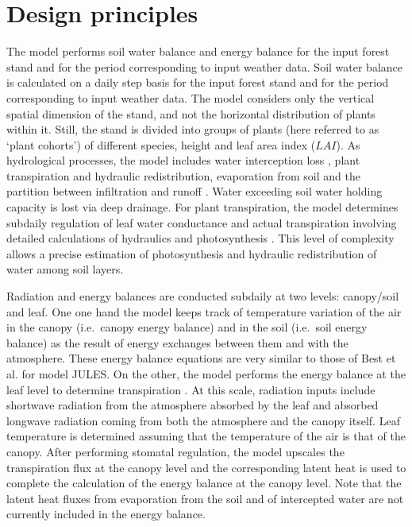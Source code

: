 \documentclass[]{book}
\begin{document}
\hypertarget{design-principles-1}{%
\section{Design principles}\label{design-principles-1}}

The model performs soil water balance and energy balance for the input forest stand and for the period corresponding to input weather data. Soil water balance is calculated on a daily step basis for the input forest stand and for the period corresponding to input weather data. The model considers only the vertical spatial dimension of the stand, and not the horizontal distribution of plants within it. Still, the stand is divided into groups of plants (here referred to as `plant cohorts') of different species, height and leaf area index (\(LAI\)). As hydrological processes, the model includes water interception loss \citep{Gash1995}, plant transpiration and hydraulic redistribution, evaporation from soil \citep{Ritchie1972} and the partition between infiltration and runoff \citep{Boughton1989}. Water exceeding soil water holding capacity is lost via deep drainage. For plant transpiration, the model determines subdaily regulation of leaf water conductance and actual transpiration involving detailed calculations of hydraulics and photosynthesis \citep{Sperry2016}. This level of complexity allows a precise estimation of photosynthesis and hydraulic redistribution of water among soil layers.

Radiation and energy balances are conducted subdaily at two levels: canopy/soil and leaf. One one hand the model keeps track of temperature variation of the air in the canopy (i.e.~canopy energy balance) and in the soil (i.e.~soil energy balance) as the result of energy exchanges between them and with the atmosphere. These energy balance equations are very similar to those of Best et al. \citeyearpar{Best2011} for model JULES. On the other, the model performs the energy balance at the leaf level to determine transpiration \citep{Sperry2016}. At this scale, radiation inputs include shortwave radiation from the atmosphere absorbed by the leaf and absorbed longwave radiation coming from both the atmosphere and the canopy itself. Leaf temperature is determined assuming that the temperature of the air is that of the canopy. After performing stomatal regulation, the model upscales the transpiration flux at the canopy level and the corresponding latent heat is used to complete the calculation of the energy balance at the canopy level. Note that the latent heat fluxes from evaporation from the soil and of intercepted water are not currently included in the energy balance.
\end{document}
